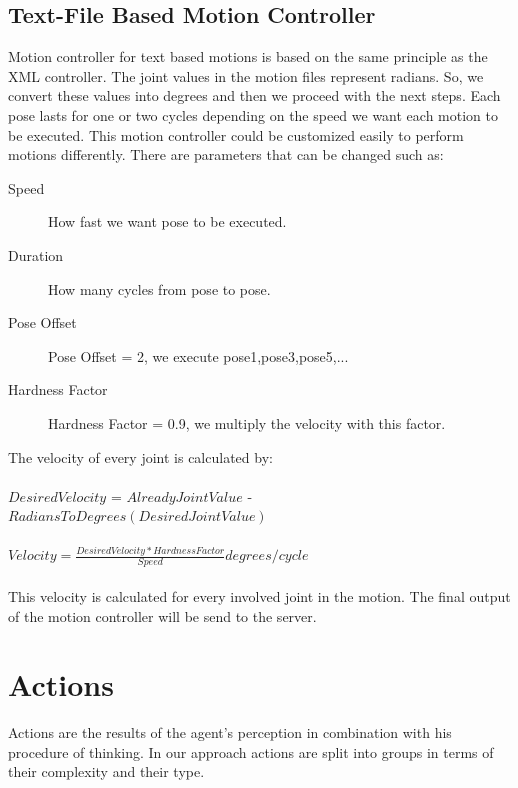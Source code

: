 \subsection{Text-File Based Motion Controller}
Motion controller for text based motions is based on the same principle as the XML controller. The joint values in the motion files represent
radians. So, we convert these values into degrees and then we proceed with the next steps. Each pose lasts for one or two cycles depending on the speed we want each motion to be executed. This motion controller could be customized easily to perform motions differently. There are parameters that can be changed such as:
\begin{description}
	\item[Speed] How fast we want pose to be executed.
	\item[Duration]	How many cycles from pose to pose.
	\item[Pose Offset] Pose Offset = 2, we execute pose1,pose3,pose5,...
	\item[Hardness Factor]	Hardness Factor = 0.9, we multiply the velocity with this factor.
\end{description}
The velocity of every joint is calculated by:\\
\\
$Desired Velocity$ = $Already Joint Value$ - $RadiansToDegrees(Desired Joint Value)$
\\
\\
$Velocity = \frac {Desired Velocity \ast Hardness Factor} {Speed} degrees/cycle$\\
\\
This velocity is calculated for every involved joint in the motion. The final output of the motion controller will be send to the server.





\section{Actions}
Actions are the results of the agent's perception in combination with his procedure of thinking.
In our approach actions are split into groups in terms of their complexity and their type. 

